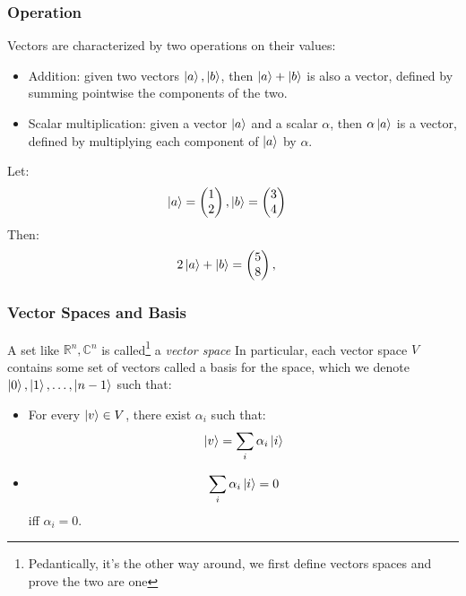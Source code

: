 \documentclass{beamer}
\begin{document}
\begin{frame}
    \frametitle{Operation}
    Vectors are characterized by two operations on their values:
    \begin{itemize}
        \item Addition: given two vectors $\ket{a}, \ket{b}$, then $\ket{a} + \ket{b}$ is also a vector, defined by summing pointwise the components of the two.
        \item Scalar multiplication: given a vector $\ket{a}$ and a scalar $\alpha$, then $\alpha \ket{a}$ is a vector, defined by multiplying each component of $\ket{a}$ by $\alpha$.
    \end{itemize}
    \begin{example}
        Let:
        \begin{align}
            \ket{a} & = \begin{pmatrix}
                1 \\
                2
            \end{pmatrix},
            \ket{b} = \begin{pmatrix}
                3 \\
                4
            \end{pmatrix}
        \end{align}
        Then:
        \begin{align}
            2\ket{a} + \ket{b} & = \begin{pmatrix}
                5 \\
                8
            \end{pmatrix},
        \end{align}
    \end{example}
\end{frame}
\begin{frame}
    \frametitle{Vector Spaces and Basis}
    A set like $\mathbb{R}^n, \mathbb{C}^n$ is called\footnote{Pedantically, it's the other way around, we first define vectors spaces and prove the two are one} a \textit{vector space}
    In particular, each vector space $V$ contains some set of vectors called a basis for the space, which we denote $\ket{0}, \ket{1}, \dots, \ket{n - 1}$ such that:
    \begin{itemize}
        \item For every $\ket{v} \in V$, there exist $\alpha_i$ such that: \[ \ket{v} = \sum_i \alpha_i \ket{i}  \]
        \item \[ \sum_i \alpha_i \ket{i} = 0 \] iff $\alpha_i = 0$.
    \end{itemize}
\end{frame}
\end{document}
